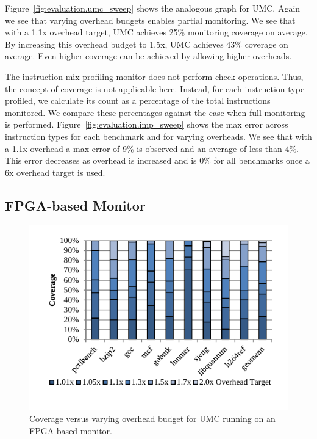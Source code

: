 Figure~\ref{fig:evaluation.umc_sweep} shows the analogous graph for UMC. Again
we see that varying overhead budgets enables partial monitoring. We see that
with a 1.1x overhead target, UMC achieves 25\% monitoring coverage on average.
By increasing this overhead budget to 1.5x, UMC achieves 43\% coverage on
average. Even higher coverage can be achieved by allowing higher overheads.

The instruction-mix profiling monitor does not perform check operations. Thus,
the concept of coverage is not applicable here. Instead, for each instruction
type profiled, we calculate its count as a percentage of the total instructions
monitored. We compare these percentages against the case when full monitoring
is performed. Figure~\ref{fig:evaluation.imp_sweep} shows the max error across
instruction types for each benchmark and for varying overheads. We see that
with a 1.1x overhead a max error of 9\% is observed and an average of less than
4\%. This error decreases as overhead is increased and is 0\% for all
benchmarks once a 6x overhead target is used.

\subsection{FPGA-based Monitor}
\label{sec:evaluation.fpga}

\begin{figure}
  \begin{center}
    \includegraphics[width=\linewidth]{figs/data_fpga_umc_sweep.pdf}
    \vspace{-0.2in}
    \caption{Coverage versus varying overhead budget for UMC running on an FPGA-based monitor.}
    \label{fig:evaluation.fpga_umc_sweep}
    \vspace{-0.1in}
  \end{center}
\end{figure}

